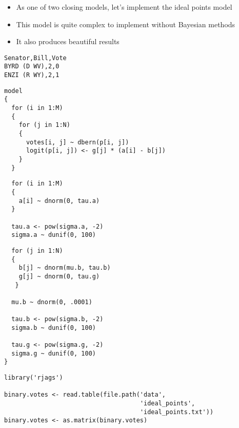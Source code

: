 \documentclass{beamer}
\begin{document}
\begin{frame}[fragile]
  \begin{itemize}
    \item{As one of two closing models, let's implement the ideal points model}
    \item{This model is quite complex to implement without Bayesian methods}
    \item{It also produces beautiful results}
  \end{itemize}
\end{frame}

\begin{frame}[fragile]
  \begin{verbatim}
Senator,Bill,Vote
BYRD (D WV),2,0
ENZI (R WY),2,1
  \end{verbatim}
\end{frame}

\begin{frame}[fragile]
  \begin{verbatim}
model
{
  for (i in 1:M)
  {
    for (j in 1:N)
    {
      votes[i, j] ~ dbern(p[i, j])
      logit(p[i, j]) <- g[j] * (a[i] - b[j])
    }
  }
  \end{verbatim}
\end{frame}

\begin{frame}[fragile]
  \begin{verbatim}
  for (i in 1:M)
  {
    a[i] ~ dnorm(0, tau.a)
  }

  tau.a <- pow(sigma.a, -2)
  sigma.a ~ dunif(0, 100)
  \end{verbatim}
\end{frame}

\begin{frame}[fragile]
  \begin{verbatim}
  for (j in 1:N)
  {
    b[j] ~ dnorm(mu.b, tau.b)
    g[j] ~ dnorm(0, tau.g)
   }

  mu.b ~ dnorm(0, .0001)

  tau.b <- pow(sigma.b, -2)
  sigma.b ~ dunif(0, 100)

  tau.g <- pow(sigma.g, -2)
  sigma.g ~ dunif(0, 100)
}
  \end{verbatim}
\end{frame}

\begin{frame}[fragile]
  \begin{verbatim}
library('rjags')

binary.votes <- read.table(file.path('data',
                                     'ideal_points',
                                     'ideal_points.txt'))
binary.votes <- as.matrix(binary.votes)
  \end{verbatim}
\end{frame}
\end{document}
